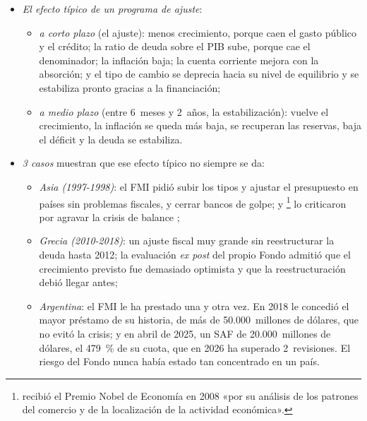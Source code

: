 \documentclass[11pt]{article}
\begin{document}
\begin{itemize}
\item \emph{El efecto típico de un programa de ajuste}:
  \begin{itemize}
  \item \emph{a corto plazo} (el ajuste): menos crecimiento, porque caen el gasto público y el crédito; la ratio de deuda sobre el PIB sube, porque cae el denominador; la inflación baja; la cuenta corriente mejora con la absorción; y el tipo de cambio se deprecia hacia su nivel de equilibrio y se estabiliza pronto gracias a la financiación;
  \item \emph{a medio plazo} (entre 6~meses y 2~años, la estabilización): vuelve el crecimiento, la inflación se queda más baja, se recuperan las reservas, baja el déficit y la deuda se estabiliza.
  \end{itemize}
\item \emph{3 casos} muestran que ese efecto típico no siempre se da:
  \begin{itemize}
  \item \emph{Asia (1997-1998)}: el FMI pidió subir los tipos y ajustar el presupuesto en países sin problemas fiscales, y cerrar bancos de golpe;  y \footnote{ recibió el Premio Nobel de Economía en 2008 «por su análisis de los patrones del comercio y de la localización de la actividad económica»\nocite{Nobel2008Krugman}.} lo criticaron por agravar la crisis de balance ;
  \item \emph{Grecia (2010-2018)}: un ajuste fiscal muy grande sin reestructurar la deuda hasta 2012; la evaluación \emph{ex post} del propio Fondo admitió que el crecimiento previsto fue demasiado optimista y que la reestructuración debió llegar antes\nocite{FMI2013GreciaExPost};
  \item \emph{Argentina}: el FMI le ha prestado una y otra vez. En 2018 le concedió el mayor préstamo de su historia, de más de 50.000~millones de dólares, que no evitó la crisis\nocite{FMI2018PR395}; y en abril de 2025, un SAF de 20.000~millones de dólares, el 479~\% de su cuota, que en 2026 ha superado 2~revisiones\nocite{FMI2025ArgentinaEFF,FMI2026ArgentinaRev2}. El riesgo del Fondo nunca había estado tan concentrado en un país.
  \end{itemize}
\end{itemize}
\end{document}
